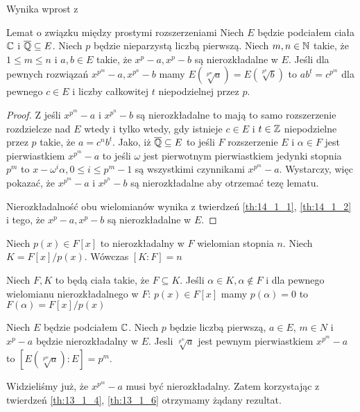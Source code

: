   Wynika wprost z \cite[Twierdzenie 14.1.2]{rom06}

\begin{lemma}{Lemat o związku między prostymi rozszerzeniami}
  Niech $E$ będzie podciałem ciała $\mathbb{C}$ i $\overline{\mathbb{Q}} \subseteq E$.
  Niech $p$ będzie nieparzystą liczbą pierwszą.
  Niech $m, n \in \mathbb{N}$ takie, że $1 \leq m \leq n$ i $a, b \in E$ takie, że $x^p
  - a, x^p - b$ są nierozkładalne w $E$.
  Jeśli dla pewnych rozwiązań $x^{p^m} - a, x^{p^n} -b$ mamy
  $E\left(\sqrt[p^m]{a}\right) = E\left(\sqrt[p^n]{b}\right)$ to $ab^t =
  c^{p^m}$ dla pewnego $c \in E$ i liczby całkowitej $t$ niepodzielnej przez
  $p$.
  \label{lem:associated_extensions}
\end{lemma}
\begin{proof}
  Z \cite[Twierdzenie 14.2.8]{rom06} jeśli $x^{p^m} - a$ i $x^{p^n} - b$ są
  nierozkładalne to mają to samo rozszerzenie rozdzielcze nad $E$ wtedy i tylko
  wtedy, gdy istnieje $c \in E$ i $t \in \mathbb{Z}$ niepodzielne przez $p$ takie, że
  $a = c^nb^t$.
  Jako, iż $\overline{\mathbb{Q}} \subseteq E$ to jeśli $F$ rozszerzenie $E$ i $\alpha
  \in F$  jest pierwiastkiem $x^{p^m} -a$ to jeśli $\omega$ jest pierwotnym
  pierwiastkiem jedynki stopnia $p^m$ to $x - \omega^i \alpha, 0 \leq i \leq p^m
  - 1$ są wszystkimi czynnikami $x^{p^m} - a$.
  Wystarczy, więc pokazać, że $x^{p^m} - a$ i $x^{p^n} - b$ są nierozkładalne
  aby otrzemać tezę lematu.

  Nierozkładalność obu wielomianów wynika z twierdzeń \ref{th:14_1_1},
  \ref{th:14_1_2} i tego, że $x^p -a, x^p - b$ są nierozkładalne w $E$.
\end{proof}

\begin{theorem}
  Niech $p(x) \in F[x]$ to nierozkładalny w $F$ wielomian stopnia $n$.
  Niech $K = F[x]/p(x)$. Wówczas $[K:F] = n$
  \label{th:13_1_6}
\end{theorem}

  \cite[Twierdzenie 13.1.6]{dum04}

\begin{theorem}
  Niech $F, K$ to będą ciała takie, że $F \subseteq K$.
  Jeśli $\alpha \in K, \alpha \not \in F$ i dla pewnego wielomianu
  nierozkładalnego w $F$: $p(x) \in F[x]$ mamy $p(\alpha) = 0$ to
  $F(\alpha) = F[x]/p(x)$
  \label{th:13_1_4}
\end{theorem}

  \cite[Twierdzenie 13.1.4]{dum04}

\begin{lemma}
  Niech $E$ będzie podciałem $\mathbb{C}$. Niech $p$ będzie liczbą pierwszą, $a \in E$,
  $m \in N$ i $x^p - a$ będzie nierozkładalny w $E$.
  Jesli $\sqrt[p^m]{a}$ jest pewnym pierwiastkiem $x^{p^m} - a$ to
  $\left[E \left(\sqrt[p^m]{a} \right) : E \right] = p^m$.
\end{lemma}

  Widzieliśmy już, że $x^{p^m} - a$ musi być nierozkładalny. Zatem korzystając z
  twierdzeń \ref{th:13_1_4}, \ref{th:13_1_6} otrzymamy żądany rezultat.
